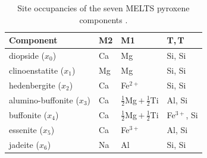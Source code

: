 \begin{table}[t]
\centering
\caption{Site occupancies of the seven \textsc{MELTS} pyroxene components
\citep{sackghiorso1994}.}
\label{tab:pxsites}
\setlength{\tabcolsep}{1.5em}
\renewcommand{\arraystretch}{1.25}
\begin{tabular*}{\textwidth}{@{\extracolsep{\fill}}llll}
\toprule
Component & M2 & M1 & T,\,T \\
\midrule
diopside ($x_0$)            & Ca & Mg                            & Si, Si \\
clinoenstatite ($x_1$)      & Mg & Mg                            & Si, Si \\
hedenbergite ($x_2$)        & Ca & Fe$^{2+}$                     & Si, Si \\
alumino-buffonite ($x_3$)   & Ca & $\tfrac12$Mg\,$+\,\tfrac12$Ti & Al, Si \\
buffonite ($x_4$)           & Ca & $\tfrac12$Mg\,$+\,\tfrac12$Ti & Fe$^{3+}$, Si \\
essenite ($x_5$)            & Ca & Fe$^{3+}$                     & Al, Si \\
jadeite ($x_6$)             & Na & Al                            & Si, Si \\
\bottomrule
\end{tabular*}
\end{table}

